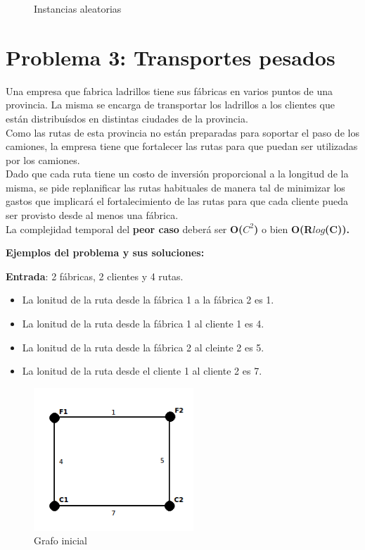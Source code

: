 \documentclass[a4paper, 10pt, twoside]{article}
\newcommand{\dosgraficos}[2]{
    \newcommand{\separacion}{-2.2em}
    \vspace{\separacion}
    
    \vspace{\separacion}
    
}
\begin{document}
\begin{figure}[H]
  \centering
  \dosgraficos{problema2-instancias-aleatorias}
              {problema2-instancias-aleatorias-n}
  \caption{Instancias aleatorias}
\end{figure}





\newpage

\section{Problema 3: Transportes pesados}

Una empresa que fabrica ladrillos tiene sus fábricas en varios puntos de una provincia. La misma se encarga de transportar los ladrillos a los clientes que están distribuísdos en distintas ciudades de la provincia.\\
Como las rutas de esta provincia no están preparadas para soportar el paso de los camiones, la empresa tiene que fortalecer las rutas para que puedan ser utilizadas por los camiones.\\
Dado que cada ruta tiene un costo de inversión proporcional a la longitud de la misma, se pide replanificar las rutas habituales de manera tal de minimizar los gastos que implicará el fortalecimiento de las rutas para que cada cliente pueda ser provisto desde al menos una fábrica.\\
La complejidad temporal del \textbf{peor caso} deberá ser \textbf{O($C^2$)} o bien \textbf{O(R$log$(C)).}

\textbf{Ejemplos del problema y sus soluciones:}

\textbf{Entrada}: 2 fábricas, 2 clientes y 4 rutas.
\begin{itemize}
\item{La lonitud de la ruta desde la fábrica 1 a la fábrica 2 es 1.}
\item{La lonitud de la ruta desde la fábrica 1 al cliente 1 es 4.}
\item{La lonitud de la ruta desde la fábrica 2 al cleinte 2 es 5.}
\item{La lonitud de la ruta desde el cliente 1 al cliente 2 es 7.}
\end{itemize}

\begin{figure}[H]
\centering
\includegraphics[width=60mm]{../ejemplo_graficos/CosoDosSubconjuntos.png}
\caption{Grafo inicial}
\label{1}
\end{figure} 
\end{document}
